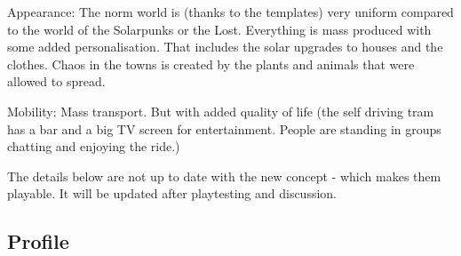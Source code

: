Appearance: The norm world is (thanks to the templates) very uniform compared to the world of the Solarpunks or the Lost. Everything is mass produced with some added personalisation. That includes the solar upgrades to houses and the clothes.
Chaos in the towns is created by the plants and animals that were allowed to spread.

Mobility: Mass transport. But with added quality of life (the self driving tram has a bar and a big TV screen for entertainment. People are standing in groups chatting and enjoying the ride.)

\begin{warning}
    The details below are not up to date with the new concept - which makes them playable. It will be updated after playtesting and discussion.
\end{warning}

\subsection{Profile}


